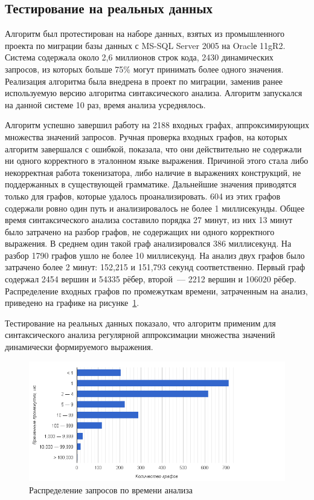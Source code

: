 \clearpage
\subsection{Тестирование на реальных данных}
Алгоритм был протестирован на наборе данных, взятых из промышленного проекта по миграции базы данных с MS-SQL Server 2005 на Oraclе 11gR2. Система содержала около 2,6 миллионов строк кода, 2430 динамических запросов, из которых больше 75\% могут принимать более одного значения. Реализация алгоритма была внедрена в проект по миграции, заменив ранее используемую версию алгоритма синтаксического анализа. Алгоритм запускался на данной системе 10 раз, время анализа усреднялось. 

Алгоритм успешно завершил работу на 2188 входных графах, аппроксимирующих множества значений запросов. Ручная проверка входных графов, на которых алгоритм завершался с ошибкой, показала, что они действительно не содержали ни одного корректного в эталонном языке выражения. Причиной этого стала либо некорректная работа токенизатора, либо наличие в выражениях конструкций, не поддержанных в существующей грамматике. Дальнейшие значения приводятся только для графов, которые удалось проанализировать. 604 из этих графов содержали ровно один путь и анализировалось не более 1 миллисекунды. Общее время синтаксического анализа составило порядка 27 минут, из них 13 минут было затрачено на разбор графов, не содержащих ни одного корректного выражения. В среднем один такой граф анализировался 386 миллисекунд. На разбор 1790 графов ушло не более 10 миллисекунд. На анализ двух графов было затрачено более 2 минут: 152,215 и 151,793 секунд соответственно. Первый граф содержал 2454 вершин и 54335 рёбер, второй~--- 2212 вершин и 106020 рёбер. Распределение входных графов по промежуткам времени, затраченным на анализ, приведено на графике на рисунке~\ref{distr}.

Тестирование на реальных данных показало, что алгоритм применим для синтаксического анализа регулярной аппроксимации множества значений динамически формируемого выражения.

\begin{figure}[H]
  \centering
 \includegraphics[width=15cm]{pics/distr.png}
 \caption{Распределение запросов по времени анализа}
 \label{distr}
\end{figure}